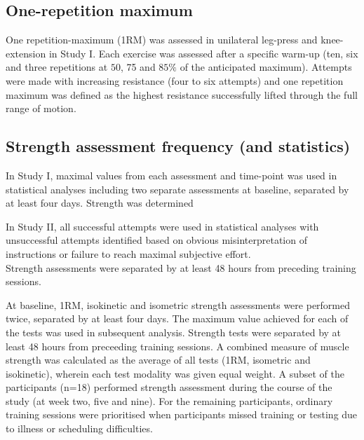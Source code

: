 \documentclass[twoside,10pt]{gihclass} %
\begin{document}
\hypertarget{one-repetition-maximum}{%
\subsection{One-repetition maximum}\label{one-repetition-maximum}}

One repetition-maximum (1RM) was assessed in unilateral leg-press and knee-extension in Study I.
Each exercise was assessed after a specific warm-up (ten, six and three repetitions at \(50\), 75 and \(85\%\) of the anticipated maximum). Attempts were made with increasing resistance (four to six attempts) and one repetition maximum was defined as the highest resistance successfully lifted through the full range of motion.

\hypertarget{strength-assessment-frequency-and-statistics}{%
\subsection{Strength assessment frequency (and statistics)}\label{strength-assessment-frequency-and-statistics}}

In Study I, maximal values from each assessment and time-point was used in statistical analyses including two separate assessments at baseline, separated by at least four days. Strength was determined

In Study II, all successful attempts were used in statistical analyses with unsuccessful attempts identified based on obvious misinterpretation of instructions or failure to reach maximal subjective effort.\\
Strength assessments were separated by at least 48 hours from preceding training sessions.

At baseline, 1RM, isokinetic and isometric strength assessments were performed twice, separated by at least four days. The maximum value achieved for each of the tests was used in subsequent analysis. Strength tests were separated by at least 48 hours from preceeding training sessions. A combined measure of muscle strength was calculated as the average of all tests (1RM, isometric and isokinetic), wherein each test modality was given equal weight. A subset of the participants (n=18) performed strength assessment during the course of the study (at week two, five and nine). For the remaining participants, ordinary training sessions were prioritised when participants missed training or testing due to illness or scheduling difficulties.
\end{document}
